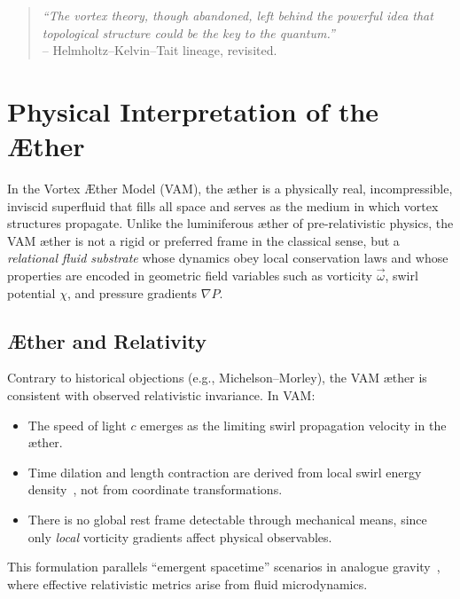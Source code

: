     \begin{quote}

    \textit{“The vortex theory, though abandoned, left behind the powerful idea that topological structure could be the key to the quantum.”} \\[0.5em]

    \hfill -- Helmholtz–Kelvin–Tait lineage, revisited.

    \end{quote}


\section{Physical Interpretation of the Æther}\label{sec:aether-interpretation}

    In the Vortex \AE ther Model (VAM), the \ae ther is a physically real, incompressible, inviscid superfluid that fills all space and serves as the medium in which vortex structures propagate. Unlike the luminiferous æther of pre-relativistic physics, the VAM æther is not a rigid or preferred frame in the classical sense, but a \emph{relational fluid substrate} whose dynamics obey local conservation laws and whose properties are encoded in geometric field variables such as vorticity $\vec{\omega}$, swirl potential $\chi$, and pressure gradients $\nabla P$.

    \subsection{Æther and Relativity}

        Contrary to historical objections (e.g., Michelson--Morley), the VAM æther is consistent with observed relativistic invariance. In VAM:

        \begin{itemize}
            \item The speed of light $c$ emerges as the limiting swirl propagation velocity in the æther.
            \item Time dilation and length contraction are derived from local swirl energy density~\cite{iskandarani2025b}, not from coordinate transformations.
            \item There is no global rest frame detectable through mechanical means, since only \emph{local} vorticity gradients affect physical observables.
        \end{itemize}

        This formulation parallels “emergent spacetime” scenarios in analogue gravity~\cite{barcelo2011}, where effective relativistic metrics arise from fluid microdynamics.

